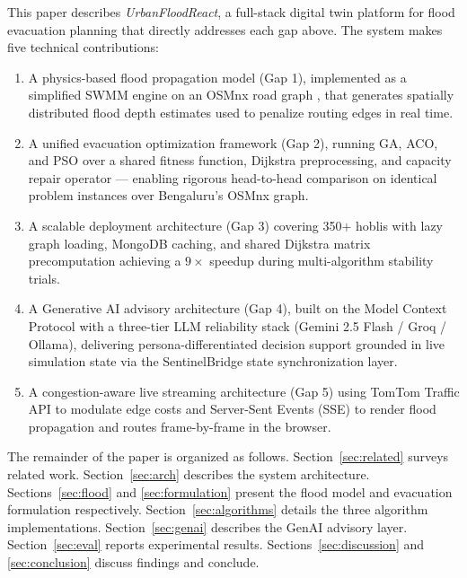 \documentclass[journal]{IEEEtran}
\begin{document}
This paper describes \textit{UrbanFloodReact}, a full-stack digital twin platform for flood
evacuation planning that directly addresses each gap above. The system makes five technical
contributions:

\begin{enumerate}
  \item A physics-based flood propagation model (Gap 1), implemented as a simplified SWMM
  engine on an OSMnx road graph \cite{boeing2017}, that generates spatially distributed
  flood depth estimates used to penalize routing edges in real time.

  \item A unified evacuation optimization framework (Gap 2), running GA, ACO, and PSO over a
  shared fitness function, Dijkstra preprocessing, and capacity repair operator — enabling
  rigorous head-to-head comparison on identical problem instances over Bengaluru's OSMnx graph.

  \item A scalable deployment architecture (Gap 3) covering 350$+$ hoblis with lazy graph
  loading, MongoDB caching, and shared Dijkstra matrix precomputation achieving a $9\times$
  speedup during multi-algorithm stability trials.

  \item A Generative AI advisory architecture (Gap 4), built on the Model Context Protocol
  \cite{anthropic2024mcp} with a three-tier LLM reliability stack (Gemini 2.5 Flash
  \cite{gemini2023} / Groq / Ollama), delivering persona-differentiated decision support
  grounded in live simulation state via the SentinelBridge state synchronization layer.

  \item A congestion-aware live streaming architecture (Gap 5) using TomTom Traffic API
  \cite{tomtom2024} to modulate edge costs and Server-Sent Events (SSE) to render flood
  propagation and routes frame-by-frame in the browser.
\end{enumerate}

The remainder of the paper is organized as follows. Section~\ref{sec:related} surveys related
work. Section~\ref{sec:arch} describes the system architecture. Sections~\ref{sec:flood} and
\ref{sec:formulation} present the flood model and evacuation formulation respectively.
Section~\ref{sec:algorithms} details the three algorithm implementations. Section~\ref{sec:genai}
describes the GenAI advisory layer. Section~\ref{sec:eval} reports experimental results.
Sections~\ref{sec:discussion} and \ref{sec:conclusion} discuss findings and conclude.
\end{document}
